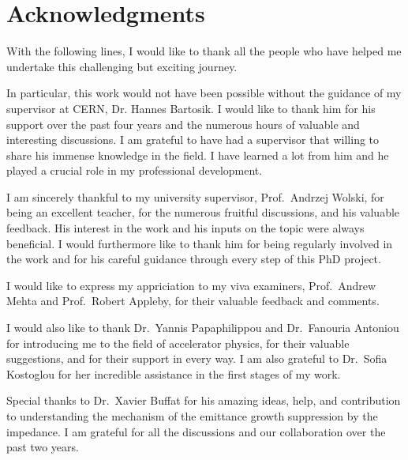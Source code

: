 \cleardoublepage
\chapter*{Acknowledgments}
\thispagestyle{simple} %



With the following lines, I would like to thank all the people who have helped me undertake this challenging but exciting journey.

In particular, this work would not have been possible without the guidance of my supervisor at CERN, Dr. Hannes Bartosik. I would like to thank him for his support over the past four years and the numerous hours of valuable and interesting discussions. I am grateful to have had a supervisor that willing to share his immense knowledge in the field. I have learned a lot from him and he played a crucial role in my professional development. 

I am sincerely thankful to my university supervisor, Prof.~Andrzej Wolski, for being an excellent teacher, for the numerous fruitful discussions, and his valuable feedback. His interest in the work and his inputs on the topic were always beneficial. I would furthermore like to thank him for being regularly involved in the work and for his careful guidance through every step of this PhD project. 

I would like to express my appriciation to my viva examiners, Prof.~Andrew Mehta and Prof.~Robert Appleby, for their valuable feedback and comments.

I would also like to thank Dr.~Yannis Papaphilippou and Dr.~Fanouria Antoniou for introducing me to the field of accelerator physics, for their valuable suggestions, and for their support in every way. I am also grateful to Dr.~Sofia Kostoglou for her incredible assistance in the first stages of my work.

Special thanks to Dr.~Xavier Buffat for his amazing ideas, help, and contribution to understanding the mechanism of the emittance growth suppression by the impedance. I am grateful for all the discussions and our collaboration over the past two years. 

